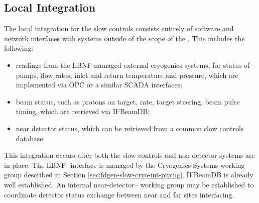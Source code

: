 \subsection{Local Integration}
\label{sec:fddp-slow-cryo-slow-loc-integ}


The local integration for the slow controls consists entirely of software
and network interfaces with systems outside of the scope of the .
This includes the following:
\begin{itemize}
\item readings from the LBNF-managed external cryogenics systems, for status of pumps, flow rates, inlet and return temperature and pressure, which are implemented via OPC or a similar SCADA interfaces;
\item beam status, such as protons on target, rate, target steering, beam pulse timing, which are retrieved via IFBeamDB;
\item near detector status, which can be retrieved from a common slow controls database.
\end{itemize}

This integration occurs after both the slow controls and non-detector
systems are in place.  The LBNF- interface is managed by the
Cryogenics Systems working group described in Section
\ref{sec:fdgen-slow-cryo-int-piping}.  IFBeamDB is already well established.
An internal near-detector-- working group may be established
to coordinate detector status exchange between near and far sites interfacing.



%
%  
%  

%
%  

